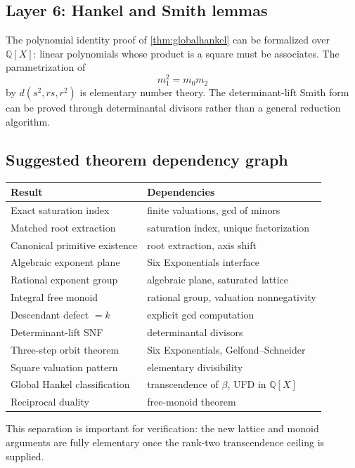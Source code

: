\documentclass[11pt]{article}
\numberwithin{equation}{section}
\theoremstyle{definition}
\newcommand{\Q}{\mathbb{Q}}
\begin{document}
\subsection{Layer 6: Hankel and Smith lemmas}

The polynomial identity proof of \cref{thm:globalhankel} can be formalized over \(\Q[X]\): linear polynomials whose product is a square must be associates. The parametrization of
\[
       m_1^2=m_0m_2
\]
by \(d(s^2,rs,r^2)\) is elementary number theory. The determinant-lift Smith form can be proved through determinantal divisors rather than a general reduction algorithm.

\subsection{Suggested theorem dependency graph}

\begin{center}
\begin{tabular}{>{\raggedright\arraybackslash}p{} >{\raggedright\arraybackslash}p{}}
\toprule
Result & Dependencies\\
\midrule
Exact saturation index & finite valuations, gcd of minors\\
Matched root extraction & saturation index, unique factorization\\
Canonical primitive existence & root extraction, axis shift\\
Algebraic exponent plane & Six Exponentials interface\\
Rational exponent group & algebraic plane, saturated lattice\\
Integral free monoid & rational group, valuation nonnegativity\\
Descendant defect \(=k\) & explicit gcd computation\\
Determinant-lift SNF & determinantal divisors\\
Three-step orbit theorem & Six Exponentials, Gelfond--Schneider\\
Square valuation pattern & elementary divisibility\\
Global Hankel classification & transcendence of \(\beta\), UFD in \(\Q[X]\)\\
Reciprocal duality & free-monoid theorem\\
\bottomrule
\end{tabular}
\end{center}

This separation is important for verification: the new lattice and monoid arguments are fully elementary once the rank-two transcendence ceiling is supplied.
\end{document}
